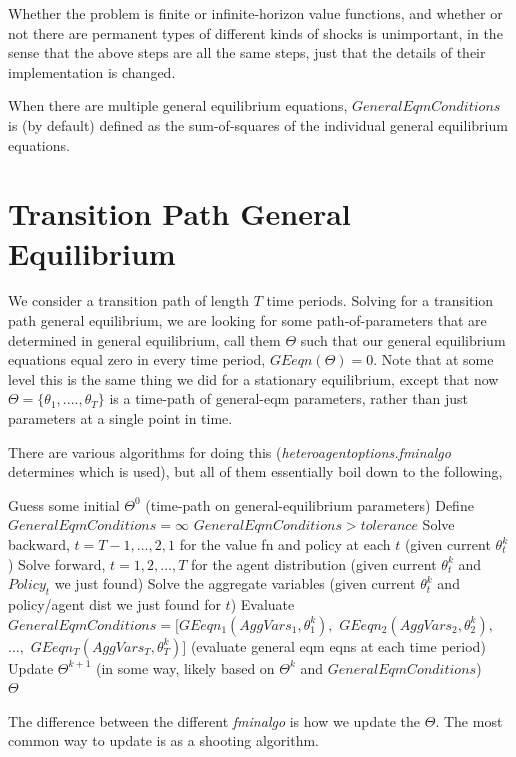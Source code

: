 \documentclass[11pt,fleqn]{article}
\begin{document}
Whether the problem is finite or infinite-horizon value functions, and whether or not there are permanent types of different kinds of shocks is unimportant, in the sense that the above steps are all the same steps, just that the details of their implementation is changed.

When there are multiple general equilibrium equations, $GeneralEqmConditions$ is (by default) defined as the sum-of-squares of the individual general equilibrium equations.


\section{Transition Path General Equilibrium}
We consider a transition path of length $T$ time periods. Solving for a transition path general equilibrium, we are looking for some path-of-parameters that are determined in general equilibrium, call them $\Theta$ such that our general equilibrium equations equal zero in every time period, $GEeqn(\Theta)=0$. Note that at some level this is the same thing we did for a stationary equilibrium, except that now $\Theta=\{\theta_1,....,\theta_T\}$ is a time-path of general-eqm parameters, rather than just parameters at a single point in time.

There are various algorithms for doing this (\textit{heteroagentoptions.fminalgo} determines which is used), but all of them essentially boil down to the following,
\begin{algorithmic}
 \State Guess some initial $\Theta^0$ (time-path on general-equilibrium parameters)
 \State Define $GeneralEqmConditions=\infty$
 \While $GeneralEqmConditions>tolerance$
 \State Solve backward, $t=T-1,\dots,2,1$ for the value fn and policy at each $t$ (given current $\theta^k_t$)
 \State Solve forward, $t=1,2,\dots,T$ for the agent distribution (given current $\theta^k_t$ and $Policy_t$ we just found)
 \State Solve the aggregate variables (given current $\theta_t^k$ and policy/agent dist we just found for $t$)
 \State Evaluate $GeneralEqmConditions=[GEeqn_1(AggVars_1,\theta_1^k),$ $GEeqn_2(AggVars_2,\theta_2^k),$$\dots,$ $GEeqn_T(AggVars_T,\theta_T^k)]$ (evaluate general eqm eqns at each time period)
 \State Update $\Theta^{k+1}$ (in some way, likely based on $\Theta^k$ and $GeneralEqmConditions$)
 \EndWhile
 \\ \Return $\Theta$
\end{algorithmic}
The difference between the different \textit{fminalgo} is how we update the $\Theta$. The most common way to update is as a shooting algorithm.
\end{document}
